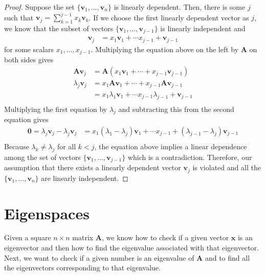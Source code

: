 \documentclass[
]{book}
\theoremstyle{definition}
\theoremstyle{definition}
\theoremstyle{definition}
\theoremstyle{definition}
\theoremstyle{remark}
\begin{document}
\begin{proof}
Suppose the set \(\{\mathbf{v}_1, \ldots, \mathbf{v}_n\}\) is linearly dependent. Then, there is some \(j\) such that \(\mathbf{v}_j = \sum_{k = 1}^{j-1} x_k \mathbf{v}_k\). If we choose the first linearly dependent vector as \(j\), we know that the subset of vectors \(\{\mathbf{v}_1, \ldots, \mathbf{v}_{j-1}\}\) is linearly independent and
\[
\begin{aligned}
\mathbf{v}_j & = x_1 \mathbf{v}_1 + \cdots x_{j-1} + \mathbf{v}_{j-1}
\end{aligned}
\]
for some scalars \(x_1, \ldots, x_{j-1}\). Multiplying the equation above on the left by \(\mathbf{A}\) on both sides gives
\[
\begin{aligned}
\mathbf{A}\mathbf{v}_j & = \mathbf{A} (x_1 \mathbf{v}_1 + \cdots + x_{j-1} \mathbf{v}_{j-1}) \\
\lambda_j \mathbf{v}_j & = x_1 \mathbf{A} \mathbf{v}_1 + \cdots + x_{j-1} \mathbf{A} \mathbf{v}_{j-1} \\
& =  x_1 \lambda_1 \mathbf{v}_1 + \cdots x_{j-1} \lambda_{j-1} + \mathbf{v}_{j-1} \\
\end{aligned}
\]
Multiplying the first equation by \(\lambda_j\) and subtracting this from the second equation gives
\[
\begin{aligned}
\mathbf{0} = \lambda_j \mathbf{v}_j - \lambda_j \mathbf{v}_j 
& = x_1 (\lambda_1 - \lambda_j) \mathbf{v}_1 + \cdots x_{j-1} + (\lambda_{j-1} - \lambda_j) \mathbf{v}_{j-1} \\
\end{aligned}
\]
Because \(\lambda_k \neq \lambda_j\) for all \(k < j\), the equation above implies a linear dependence among the set of vectors \(\{\mathbf{v}_1, \ldots, \mathbf{v}_{j-1}\}\) which is a contradiction. Therefore, our assumption that there exists a linearly dependent vector \(\mathbf{v}_j\) is violated and all the \(\{\mathbf{v}_1, \ldots, \mathbf{v}_n\}\) are linearly independent.
\end{proof}

\hypertarget{eigenspaces}{%
\section{Eigenspaces}\label{eigenspaces}}

Given a square \(n \times n\) matrix \(\mathbf{A}\), we know how to check if a given vector \(\mathbf{x}\) is an eigenvector and then how to find the eigenvalue associated with that eigenvector. Next, we want to check if a given number is an eigenvalue of \(\mathbf{A}\) and to find all the eigenvectors corresponding to that eigenvalue.
\end{document}
